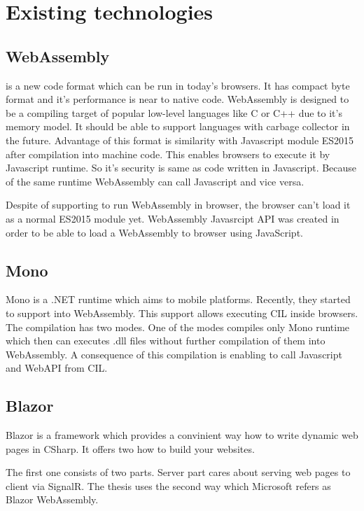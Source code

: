 \chapter{Existing technologies}

\section{WebAssembly}

\cite{WebAssembly} is a new code format which can be run in today's browsers. 
It has compact byte format and it's performance is near to native code. 
WebAssembly is designed to be a compiling target of popular low-level languages like C or C++ due to it's memory model. 
It should be able to support languages with carbage collector in the future. Advantage of this format is similarity with Javascript module ES2015 after compilation into machine code. 
This enables browsers to execute it by Javascript runtime. 
So it's security is same as code written in Javascript. 
Because of the same runtime WebAssembly can call Javascript and vice versa.

Despite of supporting to run WebAssembly in browser, the browser can't load it as a normal ES2015 module yet.
WebAssembly Javasrcipt API was created in order to be able to load a WebAssembly to browser using JavaScript.

\section{Mono}

Mono is a .NET runtime which aims to mobile platforms. 
Recently, they started to support \cite{compilation} into WebAssembly.
This support allows executing CIL inside browsers.
The compilation has two modes. 
One of the modes compiles only Mono runtime which then  can executes .dll files without further compilation of them into WebAssembly.
A consequence of this compilation is enabling to call Javascript and WebAPI from CIL.

\section{Blazor}

Blazor is a framework which provides a convinient way how to write dynamic web pages in CSharp.
It offers two \cite{Hosting models} how to build your websites.

The first one consists of two parts. Server part cares about serving web pages to client via SignalR.
The thesis uses the second way which Microsoft refers as Blazor WebAssembly.

